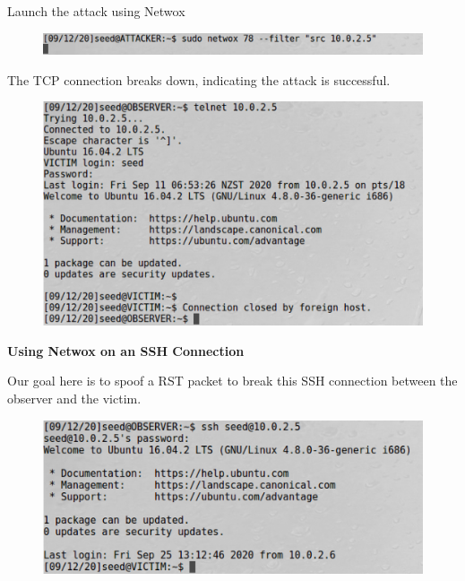 \documentclass[12pt]{article}
\begin{document}
\vspace{0.5in}

\noindent
Launch the attack using Netwox

\begin{figure}[H]
    \centering
    \includegraphics[width=1\textwidth]{tcp-telnet-attack.png}
\end{figure}



\newpage

\noindent
The TCP connection breaks down, indicating the attack is successful.

\begin{figure}[H]
    \centering
    \includegraphics[width=1\textwidth]{tcp-telnet-success.png}
\end{figure}



\newpage

\begin{center}
    \textbf{Using Netwox on an SSH Connection}
\end{center}

\noindent
Our goal here is to spoof a RST packet to break this SSH connection
between the observer and the victim.

\begin{figure}[H]
    \centering
    \includegraphics[width=1\textwidth]{tcp-sshnet-connection.png}
\end{figure}
\end{document}
